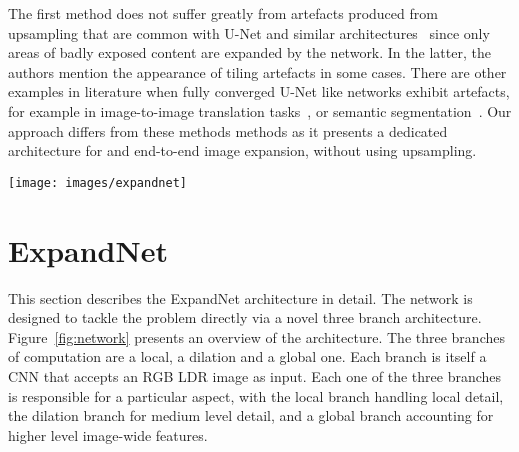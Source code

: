 \documentclass{egpubl}
\newcommand{\tc}[1]{{#1}}
\begin{document}
\tc{The first method does not suffer greatly from artefacts produced from
upsampling that are common with U-Net and similar
architectures~\cite{odena2016deconvolution} since only areas of badly exposed
content are expanded by the network. In the latter, the authors mention the
appearance of tiling artefacts in some cases. There are other examples in
literature when fully converged U-Net like networks exhibit artefacts, for
example in image-to-image translation tasks~\cite{pix2pixsuppl}, or semantic
segmentation~\cite{zhang2017suppl}. Our approach differs from these methods
methods as it presents a dedicated architecture for and end-to-end image
expansion, without using upsampling. }  
\begin{figure*}[htb]
    \centering
    \texttt{[image: images/expandnet]}
    \caption{ExpandNet architecture. The LDR input is propagated through the
    the local and dilation branches, while a resized input () is
    propagated through the global branch. The output of the global branch is
    superposed over each pixel of the outputs of the other two branches. The
    resulting features are fused using  convolutions to form the
    last feature layer which then gives an RGB HDR
    prediction.}\label{fig:network}
\end{figure*}

\section{\textbf{ExpandNet}}

This section describes the ExpandNet architecture in detail. The network is
designed to tackle the problem directly via a novel three branch architecture.
Figure~\ref{fig:network} presents an overview of the architecture. The three branches of computation are a local, a dilation and a global one.
Each branch is itself a CNN that accepts an RGB LDR image as input. Each one of the
three branches is responsible for a particular aspect, with the local branch
handling local detail, the dilation branch for medium level detail, and a
global branch accounting for higher level image-wide features.
\end{document}
